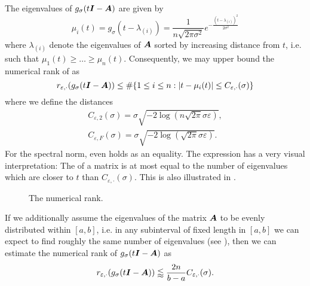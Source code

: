 The eigenvalues of $g_{\sigma}(t\boldsymbol{I} - \boldsymbol{A})$ are given by
\begin{equation}
    \mu_i(t) = g_{\sigma}(t - \lambda_{(i)}) = \frac{1}{n \sqrt{2 \pi \sigma^2}} e^{-\frac{(t - \lambda_{(i)})^2}{2 \sigma^2}}
    \label{equ:3-nystrom-kernel-function-eigenvalues}
\end{equation}
where $\lambda_{(i)}$ denote the eigenvalues of $\boldsymbol{A}$ sorted by increasing
distance from $t$, i.e. such that $\mu_1(t) \geq \dots \geq \mu_n(t)$. Consequently,
we may upper bound the numerical rank of  as
\begin{equation}
    r_{\varepsilon, \cdot}(g_{\sigma}(t\boldsymbol{I} - \boldsymbol{A})) \leq \#\{1\leq i\leq n: |t - \mu_i(t)| \leq C_{\varepsilon, \cdot}(\sigma)\}
    \label{equ:3-nystrom-kernel-numerical-rank}
\end{equation}
where we define the distances
\begin{align}
    C_{\varepsilon, 2}(\sigma) = \sigma \sqrt{-2 \log(n \sqrt{2 \pi} \sigma \varepsilon)}, \label{equ:3-nystrom-kernel-numerical-rank-spectral-constant} \\
    C_{\varepsilon, F}(\sigma) = \sigma \sqrt{-2 \log(\sqrt{2 \pi} \sigma \varepsilon)}. \label{equ:3-nystrom-kernel-numerical-rank-frobenius-constant} 
\end{align}
For the spectral norm,  even holds
as an equality.
The expression  has a very
visual interpretation: The  of a matrix is at most
equal to the number of eigenvalues which are closer to $t$ than $C_{\varepsilon, \cdot}(\sigma)$.
This is also illustrated in .\\
\begin{figure}
    \centering
    
    \caption{The numerical rank.}
    \label{fig:3-nystrom-numerical-rank-constant}
\end{figure}

If we additionally assume the eigenvalues of the matrix $\boldsymbol{A}$
to be evenly distributed within $[a, b]$, i.e. in any subinterval of fixed length in
$[a, b]$ we can expect to find roughly the same number of eigenvalues (see ), then
we can estimate the numerical rank of $g_{\sigma}(t\boldsymbol{I} - \boldsymbol{A})$ as
\begin{equation}
    r_{\varepsilon, \cdot}(g_{\sigma}(t\boldsymbol{I} - \boldsymbol{A})) \lessapprox \frac{2 n}{b - a} C_{\varepsilon, \cdot}(\sigma).
    \label{equ:3-nystrom-kernel-numerical-rank-even-eigenvalues}
\end{equation}

